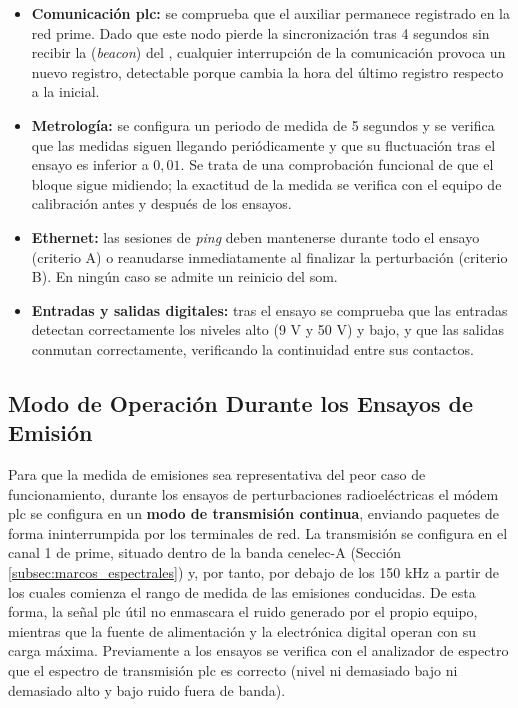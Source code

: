\begin{itemize}
    \item \textbf{Comunicación \gls{plc}:} se comprueba que el  auxiliar permanece registrado en la red \gls{prime}. Dado que este nodo pierde la sincronización tras 4 segundos sin recibir la  (\textit{beacon}) del , cualquier interrupción de la comunicación provoca un nuevo registro, detectable porque cambia la hora del último registro respecto a la inicial.
    \item \textbf{Metrología:} se configura un periodo de medida de 5 segundos y se verifica que las medidas siguen llegando periódicamente y que su fluctuación tras el ensayo es inferior a $0,01$. Se trata de una comprobación funcional de que el bloque sigue midiendo; la exactitud de la medida se verifica con el equipo de calibración antes y después de los ensayos.
    \item \textbf{Ethernet:} las sesiones de \textit{ping} deben mantenerse durante todo el ensayo (criterio A) o reanudarse inmediatamente al finalizar la perturbación (criterio B). En ningún caso se admite un reinicio del \gls{som}.
    \item \textbf{Entradas y salidas digitales:} tras el ensayo se comprueba que las entradas detectan correctamente los niveles alto (9 V y 50 V) y bajo, y que las salidas conmutan correctamente, verificando la continuidad entre sus contactos.
\end{itemize}

\subsection{Modo de Operación Durante los Ensayos de Emisión}
\label{subsec:modo_operacion_emisiones}

Para que la medida de emisiones sea representativa del peor caso de funcionamiento, durante los ensayos de perturbaciones radioeléctricas el módem \gls{plc} se configura en un \textbf{modo de transmisión continua}, enviando paquetes de forma ininterrumpida por los terminales de red. La transmisión se configura en el canal 1 de \gls{prime}, situado dentro de la banda \gls{cenelec}-A (Sección \ref{subsec:marcos_espectrales}) y, por tanto, por debajo de los 150 kHz a partir de los cuales comienza el rango de medida de las emisiones conducidas. De esta forma, la señal \gls{plc} útil no enmascara el ruido generado por el propio equipo, mientras que la fuente de alimentación y la electrónica digital operan con su carga máxima. Previamente a los ensayos se verifica con el analizador de espectro que el espectro de transmisión \gls{plc} es correcto (nivel ni demasiado bajo ni demasiado alto y bajo ruido fuera de banda).


